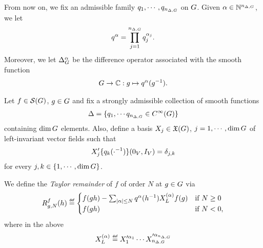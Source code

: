 \begin{remark}
    From now on, we fix an admissible family $q_1, \cdots, q_{n_{\Delta, G}}$ on $G$.
    Given $\alpha \in \mathbb{N}^{n_{\Delta, G}}$, we let
    \begin{align*}
        q^\alpha = \prod_{j = 1}^{n_{\Delta, G}} q_j^{\alpha_j}.
    \end{align*}
    Moreover, we let ${\Delta_{G}^{\alpha}}$ be the difference operator associated with the smooth function
    \begin{align*}
        G \to \mathbb{C} : g \mapsto q^\alpha(g^{-1}).
    \end{align*}
\end{remark}

\begin{definition}
\label{definition:Taylor_remainder}
    Let $f \in {\mathcal{S} (G)}$, $g \in G$
    and fix a strongly admissible collection of smooth functions
    \begin{align*}
        \Delta = \{q_1, \cdots q_{n_{\Delta, G}} \in {C^\infty(G)} \}
    \end{align*}
    containing $\dim G$ elements.
    Also, define a basis $X_j \in \mathfrak{X}(G)$, $j = 1, \cdots, \dim G$ of left-invariant vector fields such that
    \begin{align*}
        X'_j \{q_k(\cdot^{-1})\}(0_V, {I_{V}}) = \delta_{j,k}
    \end{align*}
    for every $j, k \in \{1, \cdots, \dim G\}$.

    We define the \emph{Taylor remainder} of $f$ of order $N$ at $g \in G$ via
    \begin{align*}
        \TaylorRemainder f g N(h) \defeq
        \begin{cases}
            f(g h) - \sum_{\abs \alpha \leq N} q^\alpha(h^{-1}) \TaylorLeftDifferentialOperator \alpha f(g) & \text{if } N \geq 0\\
            f(g h) & \text{if } N < 0,
        \end{cases}
    \end{align*}
    where in the above
    \begin{align*}
        \TaylorLeftDifferentialOperator \alpha \defeq X_1^{\prime \alpha_1} \cdots X_{\dimDifferenceOperators}^{\prime \alpha_{\dimDifferenceOperators}}
    \end{align*}
\end{definition}

